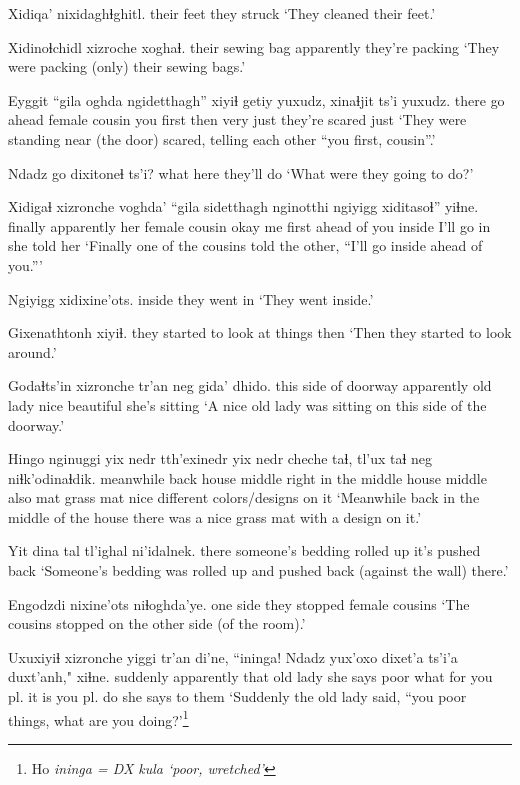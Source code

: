 \documentclass[12pt]{article}
\begin{document}
\gll Xidiqa'    nixidaghɬghitl.
{their feet} {they struck}
\glt `They cleaned their feet.'
\glend

\gll Xidinoɬchidl     xizroche xoghaɬ.
{their sewing bag}     apparently     {they're packing}
\glt `They were packing (only) their sewing bags.'
\glend

\gll Eyggit ``gila   oghda ngidetthagh'' xiyiɬ getiy yuxudz, xinaɬjit      ts'i yuxudz.
there   {go ahead}  {female cousin}   {you first} then very just {they're scared} {} just
\glt `They were standing near (the door) scared, telling each other ``you first, cousin''.'
\glend

\gll Ndadz go   dixitoneɬ ts'i?
what  here {they'll do}
\glt `What were they going to do?'
\glend

\gll Xidigaɬ xizronche voghda'  ``gila sidetthagh nginotthi    ngiyigg  xiditasoɬ''  yiɬne.
finally     apparently      {her female cousin}   okay {me first} {ahead of you} inside {I'll go in} {she told her}
\glt `Finally one of the cousins told the other, ``I'll go inside ahead of you.'''
\glend

\gll Ngiyigg xidixine'ots.
inside      {they went in}
\glt `They went inside.'
\glend

\gll Gixenathtonh                xiyiɬ.
{they started to look at things} then  
\glt `Then they started to look around.'
\glend

\gll Godaɬts'in           xizronche tr'an    neg  gida'     dhido.
{this side of doorway}       apparently   {old lady} nice beautiful {she's sitting}
\glt `A nice old lady was sitting on this side of the doorway.'
\glend

\gll Hingo     nginuggi yix   nedr   tth'exinedr         yix nedr      cheche taɬ, tl'ux taɬ neg  niɬk'odinaɬdik. 
meanwhile back    house middle {right in the middle} house middle  also mat  grass mat nice {different colors/designs on it}
\glt `Meanwhile back in the middle of the house there was a nice grass mat with a design on it.'
\glend

\gll Yit   dina      tal     tl'ighal  ni'idalnek.
there someone's bedding {rolled up} {it's pushed back}
\glt `Someone's bedding was rolled up and pushed back (against the wall) there.'
\glend

\gll Engodzdi   nixine'ots niɬoghda'ye.
{{one side}} {they stopped} {female cousins}
\glt `The cousins stopped on the other side (of the room).'
\glend

\gll Uxuxiyiɬ xizronche yiggi tr'an    di'ne, ``ininga! Ndadz yux'oxo     dixet'a ts'i'a duxt'anh,"  xiɬne.
suddenly     apparently     that  {old lady} {she says} poor     what  {for you pl.} {it is} {} {you pl. do} {she says to them}
\glt `Suddenly the old lady said, ``you poor things, what are you doing?'\footnote{Ho \em ininga \em = DX \em kula \em `poor, wretched'}
\glend 
\end{document}
